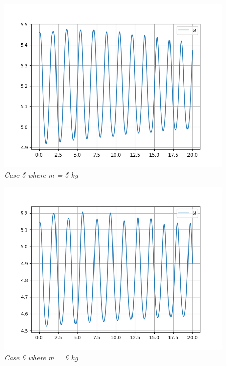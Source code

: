         \begin{figure}[H]
            \centering
            \includegraphics{Appendix/RSimPictures/AF/afm5.png}
            \caption{\textit{Case 5 where m = 5 kg}}
            \label{}
        \end{figure}
            
        \begin{figure}
            \centering
            \includegraphics{Appendix/RSimPictures/AF/afm6.png}
            \caption{\textit{Case 6 where m = 6 kg}}
            \label{}
        \end{figure}
            
